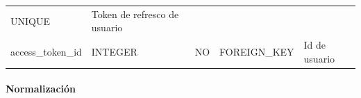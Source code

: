 \documentclass[12pt,a4paperpaper,]{report}
\let\oldparagraph\paragraph
\renewcommand{\paragraph}[1]{\oldparagraph{#1}\mbox{}}
\begin{document}
\begin{longtable}[]{@{}lllll@{}}
\begin{minipage}[t]{0.19\columnwidth}
UNIQUE\strut
\end{minipage} & \begin{minipage}[t]{0.11\columnwidth}\raggedright\strut
Token de refresco de usuario\strut
\end{minipage}\tabularnewline
\begin{minipage}[t]{0.21\columnwidth}\raggedright\strut
access\_token\_id\strut
\end{minipage} & \begin{minipage}[t]{0.19\columnwidth}\raggedright\strut
INTEGER\strut
\end{minipage} & \begin{minipage}[t]{0.16\columnwidth}\raggedright\strut
NO\strut
\end{minipage} & \begin{minipage}[t]{0.19\columnwidth}\raggedright\strut
FOREIGN\_KEY\strut
\end{minipage} & \begin{minipage}[t]{0.11\columnwidth}\raggedright\strut
Id de usuario\strut
\end{minipage}\tabularnewline
\bottomrule
\end{longtable}

\paragraph{Normalización}\label{normalizaciuxf3n-4}
\end{document}
